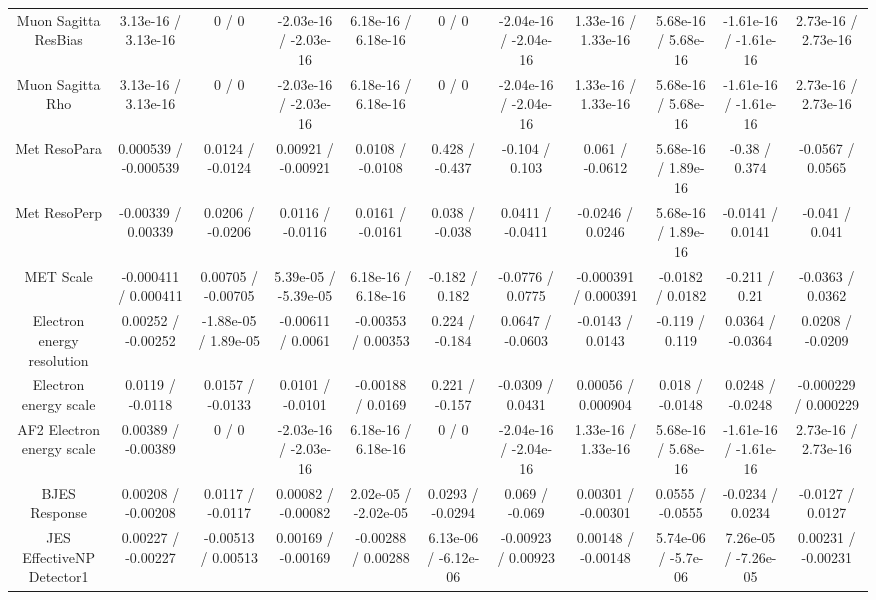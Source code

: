 \begin{table}[htbp]
\begin{center}
\begin{tabular}{|c|c|c|c|c|c|c|c|c|c|c|}
  Muon Sagitta ResBias & 3.13e-16 / 3.13e-16 & 0 / 0 & -2.03e-16 / -2.03e-16 & 6.18e-16 / 6.18e-16 & 0 / 0 & -2.04e-16 / -2.04e-16 & 1.33e-16 / 1.33e-16 & 5.68e-16 / 5.68e-16 & -1.61e-16 / -1.61e-16 & 2.73e-16 / 2.73e-16 \\ 
  Muon Sagitta Rho & 3.13e-16 / 3.13e-16 & 0 / 0 & -2.03e-16 / -2.03e-16 & 6.18e-16 / 6.18e-16 & 0 / 0 & -2.04e-16 / -2.04e-16 & 1.33e-16 / 1.33e-16 & 5.68e-16 / 5.68e-16 & -1.61e-16 / -1.61e-16 & 2.73e-16 / 2.73e-16 \\ 
  Met ResoPara & 0.000539 / -0.000539 & 0.0124 / -0.0124 & 0.00921 / -0.00921 & 0.0108 / -0.0108 & 0.428 / -0.437 & -0.104 / 0.103 & 0.061 / -0.0612 & 5.68e-16 / 1.89e-16 & -0.38 / 0.374 & -0.0567 / 0.0565 \\ 
  Met ResoPerp & -0.00339 / 0.00339 & 0.0206 / -0.0206 & 0.0116 / -0.0116 & 0.0161 / -0.0161 & 0.038 / -0.038 & 0.0411 / -0.0411 & -0.0246 / 0.0246 & 5.68e-16 / 1.89e-16 & -0.0141 / 0.0141 & -0.041 / 0.041 \\ 
  MET Scale & -0.000411 / 0.000411 & 0.00705 / -0.00705 & 5.39e-05 / -5.39e-05 & 6.18e-16 / 6.18e-16 & -0.182 / 0.182 & -0.0776 / 0.0775 & -0.000391 / 0.000391 & -0.0182 / 0.0182 & -0.211 / 0.21 & -0.0363 / 0.0362 \\ 
  Electron energy resolution & 0.00252 / -0.00252 & -1.88e-05 / 1.89e-05 & -0.00611 / 0.0061 & -0.00353 / 0.00353 & 0.224 / -0.184 & 0.0647 / -0.0603 & -0.0143 / 0.0143 & -0.119 / 0.119 & 0.0364 / -0.0364 & 0.0208 / -0.0209 \\ 
  Electron energy scale & 0.0119 / -0.0118 & 0.0157 / -0.0133 & 0.0101 / -0.0101 & -0.00188 / 0.0169 & 0.221 / -0.157 & -0.0309 / 0.0431 & 0.00056 / 0.000904 & 0.018 / -0.0148 & 0.0248 / -0.0248 & -0.000229 / 0.000229 \\ 
  AF2 Electron energy scale & 0.00389 / -0.00389 & 0 / 0 & -2.03e-16 / -2.03e-16 & 6.18e-16 / 6.18e-16 & 0 / 0 & -2.04e-16 / -2.04e-16 & 1.33e-16 / 1.33e-16 & 5.68e-16 / 5.68e-16 & -1.61e-16 / -1.61e-16 & 2.73e-16 / 2.73e-16 \\ 
  BJES Response & 0.00208 / -0.00208 & 0.0117 / -0.0117 & 0.00082 / -0.00082 & 2.02e-05 / -2.02e-05 & 0.0293 / -0.0294 & 0.069 / -0.069 & 0.00301 / -0.00301 & 0.0555 / -0.0555 & -0.0234 / 0.0234 & -0.0127 / 0.0127 \\ 
  JES EffectiveNP Detector1 & 0.00227 / -0.00227 & -0.00513 / 0.00513 & 0.00169 / -0.00169 & -0.00288 / 0.00288 & 6.13e-06 / -6.12e-06 & -0.00923 / 0.00923 & 0.00148 / -0.00148 & 5.74e-06 / -5.7e-06 & 7.26e-05 / -7.26e-05 & 0.00231 / -0.00231 \\ 

\end{tabular}
\end{center}
\end{table}
